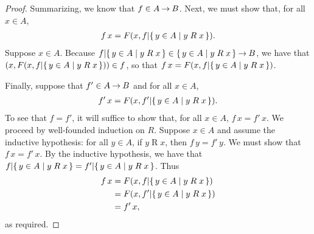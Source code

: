 \begin{proof}
Summarizing, we know that $f\in A\mathbin{\to} B$.  Next, we must show that,
for all $x\in A$,
\begin{gather*}
f\,x = F(x, f\mathord{\mid}\{ \, y\in A \mid y\mathrel{R}x \, \}) .
\end{gather*}
Suppose $x\in A$.  Because $f\mathord{\mid}\{ \, y\in A \mid y\mathrel{R}x \, \}\in
\{ \, y\in A \mid y\mathrel{R}x \, \}\mathbin{\to} B$, we have that
$(x,F(x,f\mathord{\mid}\{ \, y\in A \mid y\mathrel{R}x \, \}))\in f$, so that
$f\,x = F(x, f\mathord{\mid}\{ \, y\in A \mid y\mathrel{R}x \, \})$.

Finally, suppose that $f'\in A\mathbin{\to} B$ and
for all $x\in A$,
\begin{gather*}
f'\,x = F(x, f'\mathord{\mid}\{ \, y\in A \mid y\mathrel{R}x \, \}) .
\end{gather*}
To see that $f=f'$, it will suffice to show that, for all
$x\in A$, $f\,x=f'\,x$.  We proceed by well-founded induction
on $R$.  Suppose $x\in A$ and assume the inductive hypothesis:
for all $y\in A$, if $y\mathrel{R}x$, then $f\,y=f'\,y$.
We must show that $f\,x=f'\,x$.  By the inductive hypothesis,
we have that $f\mathord{\mid}\{ \, y\in A \mid y\mathrel{R}x \, \} =
f'\mathord{\mid}\{ \, y\in A \mid y\mathrel{R}x \, \}$.  
Thus
\begin{align*}
f\,x &= F(x, f\mathord{\mid}\{ \, y\in A \mid y\mathrel{R}x \, \}) \\
&= F(x, f'\mathord{\mid}\{ \, y\in A \mid y\mathrel{R}x \, \}) \\
&= f'\,x ,
\end{align*}
as required.
\end{proof}

